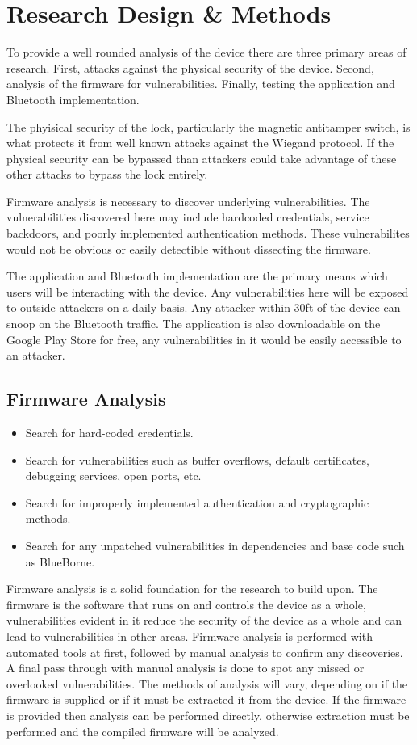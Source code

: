 \documentclass[10pt,twocolumn,letterpaper]{article}
\begin{document}
\section{Research Design \& Methods}
To provide a well rounded analysis of the device there are three primary areas of research.  First, attacks against the physical security of the device.  Second, analysis of the firmware for vulnerabilities.  Finally, testing the application and Bluetooth implementation.

The phyisical security of the lock, particularly the magnetic antitamper switch, is what protects it from well known attacks against the Wiegand protocol.  If the physical security can be bypassed than attackers could take advantage of these other attacks to bypass the lock entirely.

Firmware analysis is necessary to discover underlying vulnerabilities.  The vulnerabilities discovered here may include hardcoded credentials, service backdoors, and poorly implemented authentication methods.  These vulnerabilites would not be obvious or easily detectible without dissecting the firmware.

The application and Bluetooth implementation are the primary means which users will be interacting with the device.  Any vulnerabilities here will be exposed to outside attackers on a daily basis.  Any attacker within 30ft of the device can snoop on the Bluetooth traffic.  The application is also downloadable on the Google Play Store for free, any vulnerabilities in it would be easily accessible to an attacker.

\subsection{Firmware Analysis}
\begin{itemize}
    \item Search for hard-coded credentials.
    \item Search for vulnerabilities such as buffer overflows, default certificates, debugging services, open ports, etc.
    \item Search for improperly implemented authentication and cryptographic methods.
    \item Search for any unpatched vulnerabilities in dependencies and base code such as BlueBorne.
\end{itemize}

Firmware analysis is a solid foundation for the research to build upon.  The firmware is the software that runs on and controls the device as a whole, vulnerabilities evident in it reduce the security of the device as a whole and can lead to vulnerabilities in other areas.  Firmware analysis is performed with automated tools at first, followed by manual analysis to confirm any discoveries.  A final pass through with manual analysis is done to spot any missed or overlooked vulnerabilities.  The methods of analysis will vary, depending on if the firmware is supplied or if it must be extracted it from the device.  If the firmware is provided then analysis can be performed directly, otherwise extraction must be performed and the compiled firmware will be analyzed.
\end{document}
